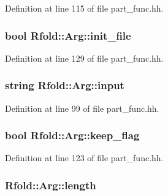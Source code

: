 Definition at line 115 of file part\+\_\+func.\+hh.

\hypertarget{class_rfold_1_1_arg_a2cb4e22a01c0d933cc18dc2f48a05649}{
\subsubsection[{init\+\_\+file}]{\setlength{\rightskip}{0pt plus 5cm}bool Rfold\+::\+Arg\+::init\+\_\+file}}\label{class_rfold_1_1_arg_a2cb4e22a01c0d933cc18dc2f48a05649}


Definition at line 129 of file part\+\_\+func.\+hh.

\hypertarget{class_rfold_1_1_arg_a9844cbade756ff05f5c9592f17a63d95}{
\subsubsection[{input}]{\setlength{\rightskip}{0pt plus 5cm}string Rfold\+::\+Arg\+::input}}\label{class_rfold_1_1_arg_a9844cbade756ff05f5c9592f17a63d95}


Definition at line 99 of file part\+\_\+func.\+hh.

\hypertarget{class_rfold_1_1_arg_ab606ce2fd660a90d7af0f1d5773ffd57}{
\subsubsection[{keep\+\_\+flag}]{\setlength{\rightskip}{0pt plus 5cm}bool Rfold\+::\+Arg\+::keep\+\_\+flag}}\label{class_rfold_1_1_arg_ab606ce2fd660a90d7af0f1d5773ffd57}


Definition at line 123 of file part\+\_\+func.\+hh.

\hypertarget{class_rfold_1_1_arg_ae5c8053e399657b0c83bd10a904ac354}{
\subsubsection[{length}]{ Rfold\+::\+Arg\+::length}}\label{class_rfold_1_1_arg_ae5c8053e399657b0c83bd10a904ac354}



